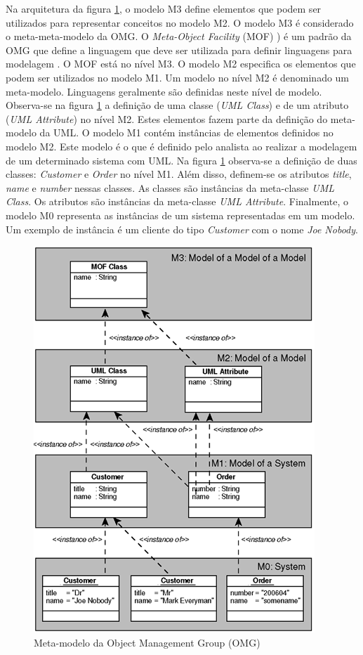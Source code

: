 Na arquitetura da figura \ref{fig:omg_meta_model}, o modelo M3 define elementos que podem ser utilizados para representar conceitos no modelo M2. O
modelo M3 é considerado o meta-meta-modelo da OMG. O \textit{Meta-Object Facility} (MOF) ) é um padrão da OMG que define a linguagem que
deve ser utilizada para definir linguagens para modelagem \cite{mof:11}. O MOF está no nível M3. O modelo M2 especifica os elementos que podem ser
utilizados no modelo M1. Um modelo no nível M2 é denominado um meta-modelo. Linguagens geralmente são definidas neste nível de modelo. Observa-se na
figura \ref{fig:omg_meta_model} a definição de uma classe (\textit{UML Class}) e de um atributo (\textit{UML Attribute}) no nível M2. Estes elementos
fazem parte da definição do meta-modelo da UML. O modelo M1 contém instâncias de elementos definidos no modelo M2. Este modelo é o que é definido
pelo analista ao realizar a modelagem de um determinado sistema com UML. Na figura \ref{fig:omg_meta_model} observa-se a definição de duas classes:
\textit{Customer} e \textit{Order} no nível M1. Além disso, definem-se os atributos \textit{title}, \textit{name} e \textit{number} nessas classes. As
classes são instâncias da meta-classe \textit{UML Class}. Os atributos são instâncias da meta-classe \textit{UML Attribute}. Finalmente, o modelo M0
representa as instâncias de um sistema representadas em um modelo. Um exemplo de instância é um cliente do tipo \textit{Customer} com o nome
\textit{Joe Nobody}.

\begin{figure}
	\centering
	\includegraphics{img/omg_meta_model.png}
	\caption{Meta-modelo da Object Management Group (OMG)}\label{fig:omg_meta_model}
\end{figure}

